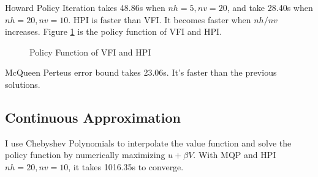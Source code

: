 \documentclass{article}
\begin{document}
	Howard Policy Iteration takes 48.86s when $nh=5, nv=20$, and take 28.40s when $nh=20,nv=10$.
	HPI is faster than VFI.
	It becomes faster when $nh/nv$ increases.
	Figure \ref{fig:hpi} is the policy function of VFI and HPI.
	\begin{figure}[H]
		\centering
		\caption{Policy Function of VFI and HPI}
		\label{fig:hpi}
	\end{figure}
	
	McQueen Perteus error bound takes 23.06s.
	It's faster than the previous solutions.
	
	\subsection{Continuous Approximation}
	
	I use Chebyshev Polynomials to interpolate the value function and solve the policy function by numerically maximizing $u+\beta V$.
	With MQP and HPI $nh=20, nv=10$, it takes 1016.35s to converge.
	
\end{document}
